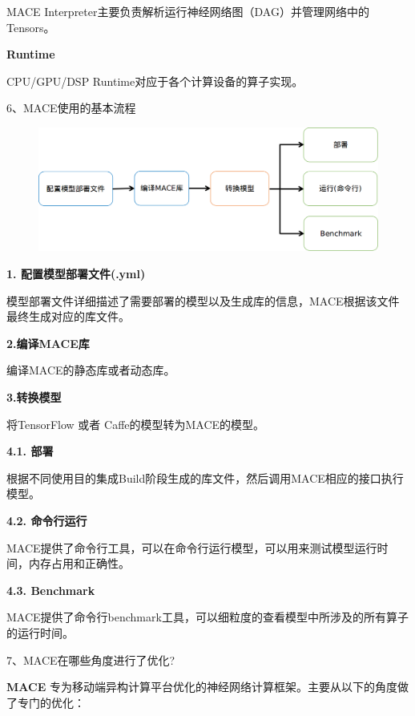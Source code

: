 MACE Interpreter主要负责解析运行神经网络图（DAG）并管理网络中的Tensors。

\textbf{Runtime}

CPU/GPU/DSP Runtime对应于各个计算设备的算子实现。

6、MACE使用的基本流程

\begin{figure}
\centering
\includegraphics{./img/ch17/mace-work-flow-zh.png}
\caption{}
\end{figure}

\textbf{1. 配置模型部署文件(.yml)}

模型部署文件详细描述了需要部署的模型以及生成库的信息，MACE根据该文件最终生成对应的库文件。

\textbf{2.编译MACE库}

编译MACE的静态库或者动态库。

\textbf{3.转换模型}

将TensorFlow 或者 Caffe的模型转为MACE的模型。

\textbf{4.1. 部署}

根据不同使用目的集成Build阶段生成的库文件，然后调用MACE相应的接口执行模型。

\textbf{4.2. 命令行运行}

MACE提供了命令行工具，可以在命令行运行模型，可以用来测试模型运行时间，内存占用和正确性。

\textbf{4.3. Benchmark}

MACE提供了命令行benchmark工具，可以细粒度的查看模型中所涉及的所有算子的运行时间。

7、MACE在哪些角度进行了优化?

\textbf{MACE}
专为移动端异构计算平台优化的神经网络计算框架。主要从以下的角度做了专门的优化：

